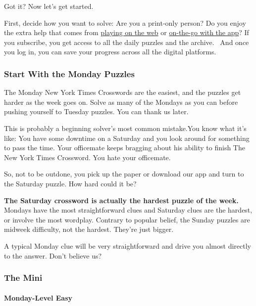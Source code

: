 Got it? Now let's get started.

First, decide how you want to solve: Are you a print-only person? Do you
enjoy the extra help that comes from
\href{https://www.nytimes.com/crosswords}{playing on the web} or
\href{https://www.nytimes.com/crosswords/apps}{on-the-go with the app}?
If you subscribe, you get access to all the daily puzzles and the
archive.~ And once you log in, you can save your progress across all the
digital platforms.

\hypertarget{start-with-the-monday-puzzles}{%
\subsubsection{Start With the Monday
Puzzles}\label{start-with-the-monday-puzzles}}

The Monday New York Times Crosswords are the easiest, and the puzzles
get harder as the week goes on. Solve as many of the Mondays as you can
before pushing yourself to Tuesday puzzles. You can thank us later.

This is probably a beginning solver's most common mistake.You know what
it's like: You have some downtime on a Saturday and you look around for
something to pass the time. Your officemate keeps bragging about his
ability to finish The New York Times Crossword. You hate your
officemate.

So, not to be outdone, you pick up the paper or download our app and
turn to the Saturday puzzle. How hard could it be?

\textbf{The Saturday crossword is actually the hardest puzzle of the
week.} Mondays have the most straightforward clues and Saturday clues
are the hardest, or involve the most wordplay. Contrary to popular
belief, the Sunday puzzles are midweek difficulty, not the hardest.
They're just bigger.

A typical Monday clue will be very straightforward and drive you almost
directly to the answer. Don't believe us?~

\hypertarget{the-mini}{%
\subsubsection{The Mini}\label{the-mini}}

\href{https://www.nytimes.com/crosswords/game/special/monday-easy}{}

\hypertarget{monday-level-easy}{%
\paragraph{Monday-Level Easy}\label{monday-level-easy}}

